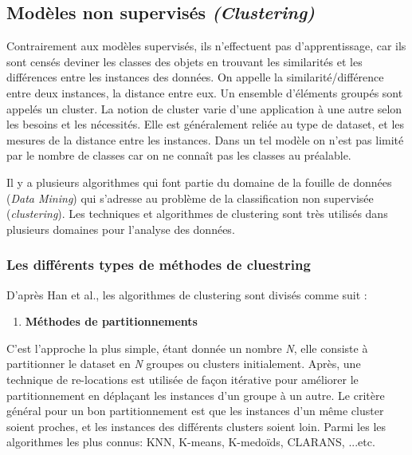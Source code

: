 \subsection{ Modèles non supervisés \textit{(Clustering)}}
Contrairement aux modèles supervisés, ils n'effectuent pas d’apprentissage, car ils sont censés deviner les classes des objets en trouvant les similarités et les différences entre les instances des données. On appelle la similarité/différence entre deux instances, la distance entre eux. Un ensemble d'éléments groupés sont appelés un cluster. La notion de cluster varie d’une application à une autre selon les besoins et les nécessités. Elle est généralement reliée au type de dataset, et les mesures de la distance entre les instances. Dans un tel modèle on n'est pas limité par le nombre de classes car on ne connaît pas les classes au préalable.

Il y a plusieurs algorithmes qui font partie du domaine de la fouille de données (\textit{Data Mining}) qui s’adresse au problème de la classification non supervisée (\textit{clustering}). Les techniques et algorithmes de clustering sont très utilisés dans plusieurs domaines pour l’analyse des données.

\subsubsection*{Les différents types de méthodes de cluestring}
D’après Han et al.\cite{ref33}, les algorithmes de clustering sont divisés comme suit :\\

\begin{enumerate}[nosep,label=\textbf{\arabic*)}]
	\item \textbf{Méthodes de partitionnements}
\end{enumerate}\mbox{}\indent C’est l’approche la plus simple, étant donnée un nombre \textit{N}, elle consiste à partitionner le dataset en \textit{N} groupes ou clusters initialement. Après, une technique de re-locations est utilisée de façon itérative pour améliorer le partitionnement en déplaçant les instances d’un groupe à un autre. Le critère général pour un bon partitionnement est que les instances d’un même cluster soient proches, et les instances des différents clusters soient loin. Parmi les les algorithmes les plus connus: KNN, K-means, K-medoïds, CLARANS, ...etc.  \\



